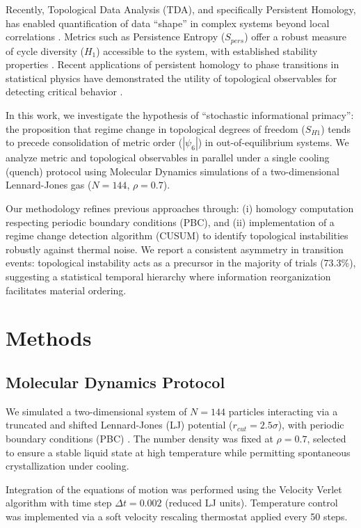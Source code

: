 \documentclass[twocolumn,showpacs,preprintnumbers,amsmath,amssymb,prb,floatfix]{revtex4-2}
\begin{document}
Recently, Topological Data Analysis (TDA), and specifically Persistent Homology, has enabled quantification of data ``shape'' in complex systems beyond local correlations \cite{edelsbrunner2010,carlsson2009,hensel2021}. Metrics such as Persistence Entropy ($S_{pers}$) offer a robust measure of cycle diversity ($H_1$) accessible to the system, with established stability properties \cite{atienza2020}. Recent applications of persistent homology to phase transitions in statistical physics have demonstrated the utility of topological observables for detecting critical behavior \cite{sale2022}.

In this work, we investigate the hypothesis of ``stochastic informational primacy'': the proposition that regime change in topological degrees of freedom ($S_{H1}$) tends to precede consolidation of metric order ($|\psi_6|$) in out-of-equilibrium systems. We analyze metric and topological observables in parallel under a single cooling (quench) protocol using Molecular Dynamics simulations of a two-dimensional Lennard-Jones gas ($N=144$, $\rho=0.7$).

Our methodology refines previous approaches through: (i) homology computation respecting periodic boundary conditions (PBC), and (ii) implementation of a regime change detection algorithm (CUSUM) to identify topological instabilities robustly against thermal noise. We report a consistent asymmetry in transition events: topological instability acts as a precursor in the majority of trials (73.3\%), suggesting a statistical temporal hierarchy where information reorganization facilitates material ordering.

\section{Methods}

\subsection{Molecular Dynamics Protocol}

We simulated a two-dimensional system of $N=144$ particles interacting via a truncated and shifted Lennard-Jones (LJ) potential ($r_{cut}=2.5\sigma$), with periodic boundary conditions (PBC) \cite{chen2011}. The number density was fixed at $\rho=0.7$, selected to ensure a stable liquid state at high temperature while permitting spontaneous crystallization under cooling.

Integration of the equations of motion was performed using the Velocity Verlet algorithm with time step $\Delta t = 0.002$ (reduced LJ units). Temperature control was implemented via a soft velocity rescaling thermostat applied every 50 steps.
\end{document}

